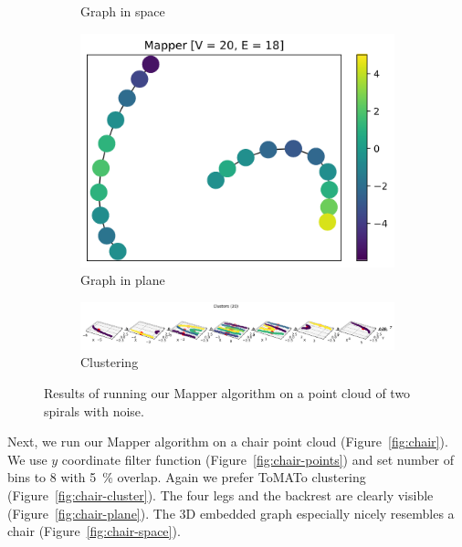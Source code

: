 \documentclass{article}
\begin{document}
\begin{figure}[ht]
\begin{subfigure}[c]{0.3\columnwidth}
        \caption{Graph in space}
        \label{fig:spirals-space}
    \end{subfigure}
    \begin{subfigure}[c]{0.3\columnwidth}
        \centering
        \includegraphics[width=\textwidth]{spirals-graph-2d}
        \caption{Graph in plane}
        \label{fig:spirals-plane}
    \end{subfigure}
    \begin{subfigure}[c]{0.9\columnwidth}
        \centering
        \includegraphics[width=\textwidth]{spirals-clusters}
        \caption{Clustering}
        \label{fig:spirals-cluster}
    \end{subfigure}
    \caption{Results of running our Mapper algorithm on a point cloud of two spirals with noise.}
    \label{fig:spirals}
\end{figure}

Next, we run our Mapper algorithm on a chair point cloud
(Figure~\ref{fig:chair}). We use $y$ coordinate filter function
(Figure~\ref{fig:chair-points}) and set number of bins to 8 with 5~\% overlap.
Again we prefer ToMATo clustering (Figure~\ref{fig:chair-cluster}). The four
legs and the backrest are clearly visible (Figure~\ref{fig:chair-plane}). The
3D embedded graph especially nicely resembles a chair (Figure~\ref{fig:chair-space}).
\end{document}
